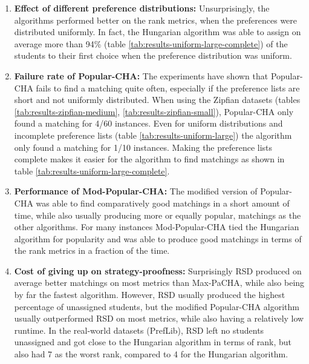 \begin{enumerate}
  \item \textbf{Effect of different preference distributions:} Unsurprisingly, the algorithms performed better on the rank metrics, when the preferences were distributed uniformly. In fact, the Hungarian algorithm was able to assign on average more than 94\% (table \ref{tab:results-uniform-large-complete}) of the students to their first choice when the preference distribution was uniform.
  \item \textbf{Failure rate of Popular-CHA:} The experiments have shown that Popular-CHA fails to find a matching quite often, especially if the preference lists are short and not uniformly distributed. When using the Zipfian datasets (tables \ref{tab:results-zipfian-medium}, \ref{tab:results-zipfian-small}), Popular-CHA only found a matching for 4/60 instances. Even for uniform distributions and incomplete preference lists (table \ref{tab:results-uniform-large}) the algorithm only found a matching for 1/10 instances. Making the preference lists complete makes it easier for the algorithm to find matchings as shown in table \ref{tab:results-uniform-large-complete}.
  \item \textbf{Performance of Mod-Popular-CHA:} The modified version of Popular-CHA was able to find comparatively good matchings in a short amount of time, while also usually producing more or equally popular, matchings as the other algorithms. For many instances Mod-Popular-CHA tied the Hungarian algorithm for popularity and was able to produce good matchings in terms of the rank metrics in a fraction of the time.
  \item \textbf{Cost of giving up on strategy-proofness:} Surprisingly RSD produced on average better matchings on most metrics than Max-PaCHA, while also being by far the fastest algorithm. However, RSD usually produced the highest percentage of unassigned students, but the modified Popular-CHA algorithm usually outperformed RSD on most metrics, while also having a relatively low runtime. In the real-world datasets (PrefLib), RSD left no students unassigned and got close to the Hungarian algorithm in terms of rank, but also had 7 as the worst rank, compared to 4 for the Hungarian algorithm. 

\end{enumerate}

